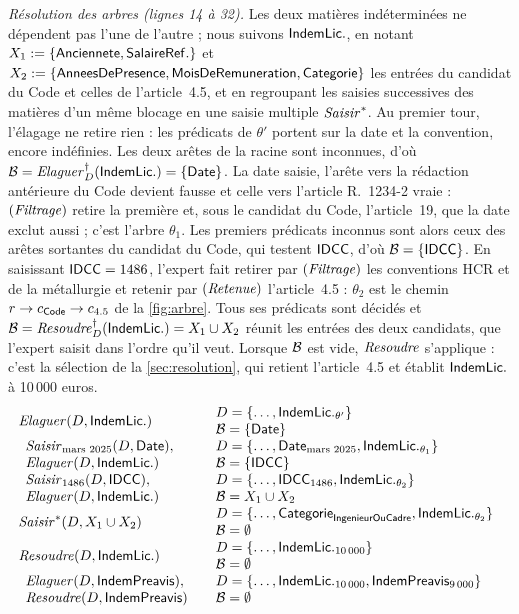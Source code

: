 \documentclass[review]{jflart}
\begin{document}
\emph{Résolution des arbres (lignes 14 à 32).} Les deux matières
indéterminées ne dépendent pas l'une de l'autre ; nous suivons \(\mathsf{IndemLic.}\),
en notant \(X_1:=\{\mathsf{Anciennete},\mathsf{SalaireRef.}\}\) et
\(X_2:=\{\mathsf{AnneesDePresence},\mathsf{MoisDeRemuneration},\mathsf{Categorie}\}\)
les entrées du candidat du Code et celles de l'article~4.5, et en
regroupant les saisies successives des matières d'un même blocage en une
saisie multiple \(\mathit{Saisir}^{*}\). Au premier tour, l'élagage ne retire rien :
les prédicats de \(\theta'\) portent sur la date et la convention, encore
indéfinies. Les deux arêtes de la racine sont inconnues, d'où
\(\mathcal{B}=\mathit{Elaguer}^\dagger_D(\mathsf{IndemLic.})=\{\mathsf{Date}\}\). La date saisie, l'arête vers la
rédaction antérieure du Code devient fausse et celle vers l'article
R.~1234-2 vraie : \((\mathit{Filtrage})\) retire la première et, sous le candidat du
Code, l'article~19, que la date exclut aussi ; c'est l'arbre \(\theta_1\).
Les premiers prédicats inconnus sont alors ceux des arêtes sortantes du
candidat du Code, qui testent \(\mathsf{IDCC}\), d'où \(\mathcal{B}=\{\mathsf{IDCC}\}\). En
saisissant \(\mathsf{IDCC}=1486\), l'expert fait
retirer par \((\mathit{Filtrage})\) les conventions HCR et de la métallurgie et retenir
par \((\mathit{Retenue})\) l'article~4.5 : \(\theta_2\) est le chemin
\(r\to c_{\mathsf{Code}}\to c_{4.5}\) de la \autoref{fig:arbre}. Tous ses prédicats
sont décidés et \(\mathcal{B}=\mathit{Resoudre}^\dagger_D(\mathsf{IndemLic.})=X_1\cup X_2\) réunit les
entrées des deux candidats, que l'expert saisit dans l'ordre qu'il veut.
Lorsque \(\mathcal{B}\) est vide, \(\mathit{Resoudre}\) s'applique : c'est la sélection de la
\autoref{sec:resolution}, qui retient l'article~4.5 et établit \(\mathsf{IndemLic.}\)
à 10\,000 euros.
\def\ops#1#2{\begin{array}{l} #1 \\ #2 \end{array}}
{\small
\[
\begin{array}{ll}
\Prune(D,\Indem) & \state{\dots,\Indem_{\theta'}}{\{\DateT\}}\\[4pt]
\ops{\Input_{\text{mars 2025}}(D,\DateT),}{\Prune(D,\Indem)} & \state{\dots,\DateT_{\text{mars 2025}},\Indem_{\theta_1}}{\{\IDCC\}}\\[4pt]
\ops{\Input_{1486}(D,\IDCC),}{\Prune(D,\Indem)} & \state{\dots,\IDCC_{1486},\Indem_{\theta_2}}{X_1\cup X_2}\\[4pt]
\Input^{*}(D,X_1\cup X_2) & \state{\dots,\Categorie_{\Cadre},\Indem_{\theta_2}}{\emptyset}\\[4pt]
\Resolve(D,\Indem) & \state{\dots,\Indem_{10\,000}}{\emptyset}\\[4pt]
\ops{\Prune(D,\ICP),}{\Resolve(D,\ICP)} & \state{\dots,\Indem_{10\,000},\ICP_{9\,000}}{\emptyset}\\
\end{array}
\]
}
\end{document}
